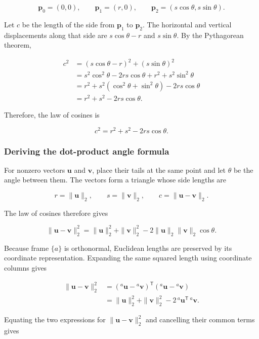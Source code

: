 \documentclass[
  australian,
  12pt,
  letterpaper,
  DIV=11,
  numbers=noendperiod,
  twoside]{scrreprt}
\begin{document}
\[
\mathbf{p}_0=(0,0),
\qquad
\mathbf{p}_1=(r,0),
\qquad
\mathbf{p}_2=(s\cos\theta,s\sin\theta).
\]

Let \(c\) be the length of the side from \(\mathbf{p}_1\) to
\(\mathbf{p}_2\). The horizontal and vertical displacements along that
side are \(s\cos\theta-r\) and \(s\sin\theta\). By the Pythagorean
theorem,

\[
\begin{aligned}
c^2
&=(s\cos\theta-r)^2+(s\sin\theta)^2\\
&=s^2\cos^2\theta-2rs\cos\theta+r^2
  +s^2\sin^2\theta\\
&=r^2+s^2\left(\cos^2\theta+\sin^2\theta\right)
  -2rs\cos\theta\\
&=r^2+s^2-2rs\cos\theta.
\end{aligned}
\]

Therefore, the law of cosines is

\[
\boxed{c^2=r^2+s^2-2rs\cos\theta}.
\]

\subsubsection{Deriving the dot-product angle
formula}\label{deriving-the-dot-product-angle-formula}

For nonzero vectors \(\mathbf{u}\) and \(\mathbf{v}\), place their tails
at the same point and let \(\theta\) be the angle between them. The
vectors form a triangle whose side lengths are

\[
r=\|\mathbf{u}\|_2,
\qquad
s=\|\mathbf{v}\|_2,
\qquad
c=\|\mathbf{u}-\mathbf{v}\|_2.
\]

The law of cosines therefore gives

\[
\|\mathbf{u}-\mathbf{v}\|_2^2
=
\|\mathbf{u}\|_2^2+\|\mathbf{v}\|_2^2
-2\|\mathbf{u}\|_2\|\mathbf{v}\|_2\cos\theta.
\]

Because frame \(\{a\}\) is orthonormal, Euclidean lengths are preserved
by its coordinate representation. Expanding the same squared length
using coordinate columns gives

\[
\begin{aligned}
\|\mathbf{u}-\mathbf{v}\|_2^2
&=
\left({}^{a}\mathbf{u}-{}^{a}\mathbf{v}\right)^\mathsf{T}
\left({}^{a}\mathbf{u}-{}^{a}\mathbf{v}\right)\\
&=
\|\mathbf{u}\|_2^2+\|\mathbf{v}\|_2^2
-2\,{}^{a}\mathbf{u}^\mathsf{T}\,{}^{a}\mathbf{v}.
\end{aligned}
\]

Equating the two expressions for \(\|\mathbf{u}-\mathbf{v}\|_2^2\) and
cancelling their common terms gives
\end{document}
